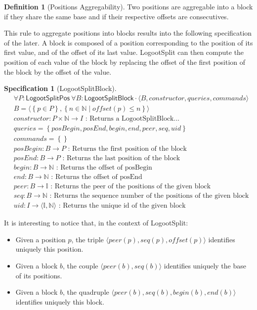\documentclass{article}
\newcommand{\commands}[1]{commands = \set{#1}}
\newcommand{\fnspec}[3]{#1: #2 \text{ : #3}}
\newcommand{\inbb}[1]{\in \mathbb{#1}}
\newcommand{\queries}[1]{queries = \set{#1}}
\newcommand{\set}[1]{\left\{#1\right\}} %
\newcommand{\spectuple}[1]{\tuple{#1, constructor, queries, commands}}
\newcommand{\ssep}{\mid} %
\newcommand{\tuple}[1]{\langle #1 \rangle}
\newcounter{definition-counter}
\theoremstyle{definition}
\newtheorem{definition}[definition-counter]{Definition}
\theoremstyle{definition}
\theoremstyle{definition}
\newcounter{specificationcounter}
\theoremstyle{definition}
\newtheorem{specification}[specificationcounter]{Specification}
\begin{document}
\begin{definition}[Positions Aggregability]
    Two positions are aggregable into a block if they share the same base and if their respective offsets are consecutives.
\end{definition}

This rule to aggregate positions into blocks results into the following specification of the later.
A block is composed of a position corresponding to the position of its first value, and of the offset of its last value.
LogootSplit can then compute the position of each value of the block by replacing the offset of the first position of the block by the offset of the value.

\begin{specification}[LogootSplitBlock]
    \begin{align*}
    &\forall P: \mathsf{LogootSplitPos} \ \forall B: \mathsf{LogootSplitBlock} \cdot \spectuple{B}\\
    &B = \tuple{\set{p \in P}, \set{n \inbb{N} \ssep offset(p) \leq n}}\\
    &\fnspec{constructor}{P \times \mathbb{N} \to I}{Returns a LogootSplitBlock...}\\
    &\queries{posBegin, posEnd, begin, end, peer, seq, uid}\\
    &\commands{}\\
    &\fnspec{posBegin}{B \to P}{Returns the first position of the block}\\
    &\fnspec{posEnd}{B \to P}{Returns the last position of the block}\\
    &\fnspec{begin}{B \to \mathbb{N}}{Returns the offset of posBegin}\\
    &\fnspec{end}{B \to \mathbb{N}}{Returns the offset of posEnd}\\
    &\fnspec{peer}{B \to \mathbb{I}}{Returns the peer of the positions of the given block}\\
    &\fnspec{seq}{B \to \mathbb{N}}{Returns the sequence number of the positions of the given block}\\
    &\fnspec{uid}{I \to \tuple{\mathbb{I}, \mathbb{N}}}{Returns the unique id of the given block}
    \end{align*}
    \label{spec:logootsplit-block}
\end{specification}

It is interesting to notice that, in the context of LogootSplit:
\begin{itemize}
    \item Given a position $p$, the triple $\tuple{peer(p), seq(p), offset(p)}$ identifies uniquely this position.
    \item Given a block $b$, the couple $\tuple{peer(b), seq(b)}$ identifies uniquely the base of its positions.
    \item Given a block $b$, the quadruple $\tuple{peer(b), seq(b), begin(b), end(b)}$ identifies uniquely this block.
\end{itemize}
\end{document}
